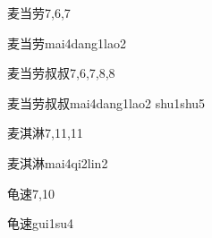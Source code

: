 \begin{entry}{麦当劳}{7,6,7}
  \begin{phonetics}{麦当劳}{mai4dang1lao2}
  \end{phonetics}
\end{entry}

\begin{entry}{麦当劳叔叔}{7,6,7,8,8}
  \begin{phonetics}{麦当劳叔叔}{mai4dang1lao2 shu1shu5}
  \end{phonetics}
\end{entry}

\begin{entry}{麦淇淋}{7,11,11}
  \begin{phonetics}{麦淇淋}{mai4qi2lin2}
  \end{phonetics}
\end{entry}

\begin{entry}{龟速}{7,10}
  \begin{phonetics}{龟速}{gui1su4}
  \end{phonetics}
\end{entry}


